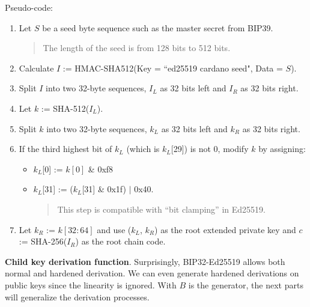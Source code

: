 Pseudo-code:
\begin{enumerate}
    \item Let $S$ be a seed byte sequence such as the master secret from BIP39.
          \begin{quote}
              The length of the seed is from 128 bits to 512 bits.
          \end{quote}
          \bigskip

    \item Calculate $I$ := HMAC-SHA512(Key = ``ed25519 cardano seed", Data = $S$).
          \bigskip
    \item Split $I$ into two 32-byte sequences, $I_L$ as 32 bits left and $I_R$ as 32 bits right.
          \bigskip

    \item Let $k$ := SHA-512($I_L$).
          \bigskip
    \item Split $k$ into two 32-byte sequences, $k_L$ as 32 bits left and $k_R$ as 32 bits right.
          \bigskip
    \item If the third highest bit of $k_L$ (which is $k_L$[29]) is not 0, modify $k$ by assigning:
          \begin{itemize}
              \item $k_L$[0] := $k[0]$ \& 0xf8
              \item $k_L$[31] := ($k_L$[31] \& 0x1f) $|$ 0x40.
                    \begin{quote}
                        This step is compatible with “bit clamping” in Ed25519.
                    \end{quote}
          \end{itemize}
          \bigskip
    \item Let $k_R$ := $k[32:64]$ and use ($k_L$, $k_R$) as the root extended private key and $c$ := SHA-256($I_R$) as the root chain code.
\end{enumerate}

\bigskip
{\textbf{Child key derivation function}}. Surprisingly, BIP32-Ed25519 allows both normal and hardened derivation. We can even generate hardened derivations on public keys since the linearity is ignored. With $B$ is the generator, the next parts will generalize the derivation processes.

